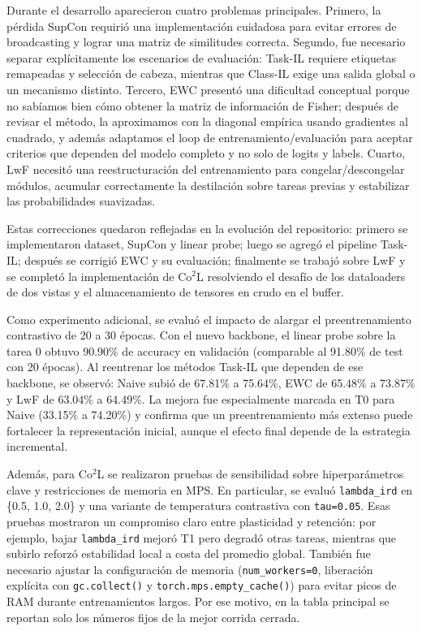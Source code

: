 \documentclass[10pt,a4paper]{article}
\begin{document}
Durante el desarrollo aparecieron cuatro problemas principales. Primero, la pérdida SupCon requirió una implementación cuidadosa para evitar errores de broadcasting y lograr una matriz de similitudes correcta. Segundo, fue necesario separar explícitamente los escenarios de evaluación: Task-IL requiere etiquetas remapeadas y selección de cabeza, mientras que Class-IL exige una salida global o un mecanismo distinto. Tercero, EWC presentó una dificultad conceptual porque no sabíamos bien cómo obtener la matriz de información de Fisher; después de revisar el método, la aproximamos con la diagonal empírica usando gradientes al cuadrado, y además adaptamos el loop de entrenamiento/evaluación para aceptar criterios que dependen del modelo completo y no solo de logits y labels. Cuarto, LwF necesitó una reestructuración del entrenamiento para congelar/descongelar módulos, acumular correctamente la destilación sobre tareas previas y estabilizar las probabilidades suavizadas.

Estas correcciones quedaron reflejadas en la evolución del repositorio: primero se implementaron dataset, SupCon y linear probe; luego se agregó el pipeline Task-IL; después se corrigió EWC y su evaluación; finalmente se trabajó sobre LwF y se completó la implementación de Co$^2$L resolviendo el desafío de los dataloaders de dos vistas y el almacenamiento de tensores en crudo en el buffer.

Como experimento adicional, se evaluó el impacto de alargar el preentrenamiento contrastivo de 20 a 30 épocas. Con el nuevo backbone, el linear probe sobre la tarea 0 obtuvo 90.90\% de accuracy en validación (comparable al 91.80\% de test con 20 épocas). Al reentrenar los métodos Task-IL que dependen de ese backbone, se observó: Naive subió de 67.81\% a 75.64\%, EWC de 65.48\% a 73.87\% y LwF de 63.04\% a 64.49\%. La mejora fue especialmente marcada en T0 para Naive (33.15\% a 74.20\%) y confirma que un preentrenamiento más extenso puede fortalecer la representación inicial, aunque el efecto final depende de la estrategia incremental.

Además, para Co$^2$L se realizaron pruebas de sensibilidad sobre hiperparámetros clave y restricciones de memoria en MPS. En particular, se evaluó \texttt{lambda\_ird} en \{0.5, 1.0, 2.0\} y una variante de temperatura contrastiva con \texttt{tau=0.05}. Esas pruebas mostraron un compromiso claro entre plasticidad y retención: por ejemplo, bajar \texttt{lambda\_ird} mejoró T1 pero degradó otras tareas, mientras que subirlo reforzó estabilidad local a costa del promedio global. También fue necesario ajustar la configuración de memoria (\texttt{num\_workers=0}, liberación explícita con \texttt{gc.collect()} y \texttt{torch.mps.empty\_cache()}) para evitar picos de RAM durante entrenamientos largos. Por ese motivo, en la tabla principal se reportan solo los números fijos de la mejor corrida cerrada.
\end{document}
